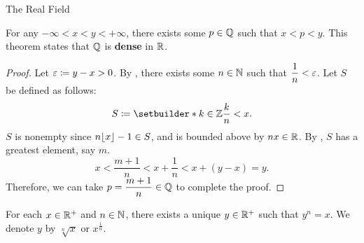 \begin{section}{The Real Field}
\bigskip

\begin{theorem} \label{thm:QIsDenseInR}
    For any $- \infty < x < y < + \infty$, there exists some $p \in \mathbb{Q}$ such that $x < p < y$.
    This theorem states that $\mathbb{Q}$ is \textbf{dense} in $\mathbb{R}$.
\end{theorem}

\begin{proof}
    Let $\varepsilon \coloneqq y - x > 0$. By , there exists some $n \in \mathbb{N}$
    such that $\dfrac{1}{n} < \varepsilon$. Let $S$ be defined as follows:
    \[
    S \coloneqq \setbuilder*{k \in \Z}{\dfrac{k}{n} < x}.
    \]
    $S$ is nonempty since $n\lfloor x\rfloor - 1 \in S$, and is bounded above by $nx \in \mathbb{R}$.
    By , $S$ has a greatest element, say $m$.
    \[
    x < \frac{m + 1}{n} < x + \frac{1}{n} < x + (y - x) = y.
    \]
    Therefore, we can take $p = \dfrac{m + 1}{n} \in \mathbb{Q}$ to complete the proof.
\end{proof}

\bigskip

\begin{theorem} \label{thm:ExistenceOfNthRoots}
    For each $x \in \mathbb{R}^{+}$ and $n \in \mathbb{N}$, there exists a unique $y \in \mathbb{R}^{+}$ such that
    $y^{n} = x$. We denote $y$ by $\sqrt[n]{x}$ or $x^{\frac{1}{n}}$.
\end{theorem}


\end{section}
